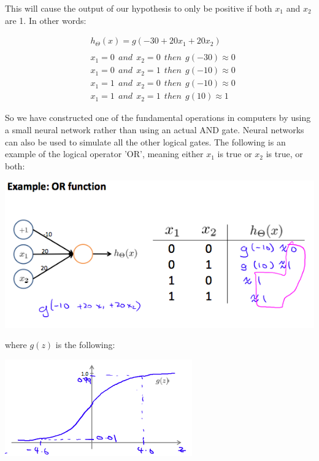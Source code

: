 \documentclass[10pt,a4paper,UTF8]{article}
\begin{document}
This will cause the output of our hypothesis to only be positive if both \(x_{1}\) and \(x_{2}\) are 1. In other words:

\begin{align*}& h_\Theta(x) = g(-30 + 20x_1 + 20x_2) \\ \\ & x_1 = 0 \ \ and \ \ x_2 = 0 \ \ then \ \ g(-30) \approx 0 \\ & x_1 = 0 \ \ and \ \ x_2 = 1 \ \ then \ \ g(-10) \approx 0 \\ & x_1 = 1 \ \ and \ \ x_2 = 0 \ \ then \ \ g(-10) \approx 0 \\ & x_1 = 1 \ \ and \ \ x_2 = 1 \ \ then \ \ g(10) \approx 1\end{align*}

So we have constructed one of the fundamental operations in computers by using a small neural network rather than using an actual AND gate. Neural networks can also be used to simulate all the other logical gates. The following is an example of the logical operator 'OR', meaning either \(x_{1}\) is true or \(x_{2}\) is true, or both:


\begin{center}
\includegraphics[width=.9\linewidth]{../../img/computer_ng/20171012or.png}
\end{center}

where \(g(z)\) is the following:

\begin{center}
\includegraphics[width=.9\linewidth]{../../img/computer_ng/20171012gz.png}
\end{center}
\end{document}
